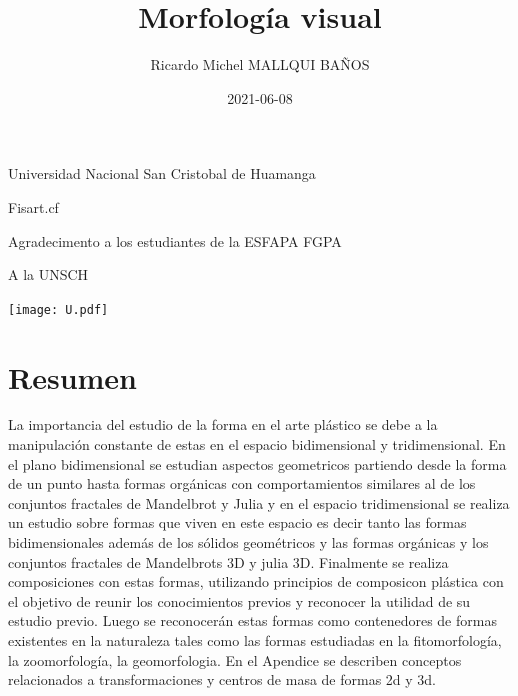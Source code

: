 \documentclass[
  16pt,
]{krantz}
\title{Morfología visual}
\author{Ricardo Michel MALLQUI BAÑOS}
\date{2021-06-08}
\theoremstyle{definition}
\theoremstyle{definition}
\theoremstyle{definition}
\theoremstyle{definition}
\theoremstyle{remark}
\begin{document}
\maketitle

\thispagestyle{empty}
\begin{flushright}
Universidad Nacional San Cristobal de Huamanga

Fisart.cf

Agradecimento a los estudiantes de la ESFAPA FGPA

A la UNSCH

\texttt{[image: U.pdf]}
\end{flushright}

{
\hypersetup{linkcolor=}
\setcounter{tocdepth}{2}
\tableofcontents
}
\listoftables
\listoffigures
\newcommand{\N}{\mathbb{N}}
\newcommand{\R}{\mathbb{R}}
\newcommand{\CC}{\mathbb{C}}
\newcommand{\I}{\mathbb{I}}
\newcommand{\f}{\mathbb{f}}
\newcommand{\X}{\mathbb{X}}
\newcommand{\D}{\mathbb{D}}
\newcommand{\Z}{\mathbb{Z}}
\newcommand{\Q}{\mathbb{Q}}
\newcommand{\norm}[1]{\left\Vert#1\right\Vert}
\newcommand{\abs}[1]{\left\vert#1\right\vert}
\newcommand{\set}[1]{\left\{#1\right\}}
\newcommand{\seq}[1]{\left<#1\right>}
\newcommand{\co}[1]{\left[#1\right]}
\newcommand{\cc}[1]{\left(#1\right)}
\newcommand{\J}{\mathcal{J}}
\newcommand{\K}{\mathcal{K}}
\newcommand{\M}{\mathcal{M}}
\newcommand{\F}{\mathcal{F}}

\hypertarget{resumen}{%
\chapter*{Resumen}\label{resumen}}


La importancia del estudio de la forma en el arte plástico se debe a la manipulación constante de estas en el espacio bidimensional y tridimensional. En el plano bidimensional se estudian aspectos geometricos partiendo desde la forma de un punto hasta formas orgánicas con comportamientos similares al de los conjuntos fractales de Mandelbrot y Julia y en el espacio tridimensional se realiza un estudio sobre formas que viven en este espacio es decir tanto las formas bidimensionales además de los sólidos geométricos y las formas orgánicas y los conjuntos fractales de Mandelbrots 3D y julia 3D. Finalmente se realiza composiciones con estas formas, utilizando principios de composicon plástica con el objetivo de reunir los conocimientos previos y reconocer la utilidad de su estudio previo. Luego se reconocerán estas formas como contenedores de formas existentes en la naturaleza tales como las formas estudiadas en la fitomorfología, la zoomorfología, la geomorfologia. En el Apendice se describen conceptos relacionados a transformaciones y centros de masa de formas 2d y 3d.
\end{document}
